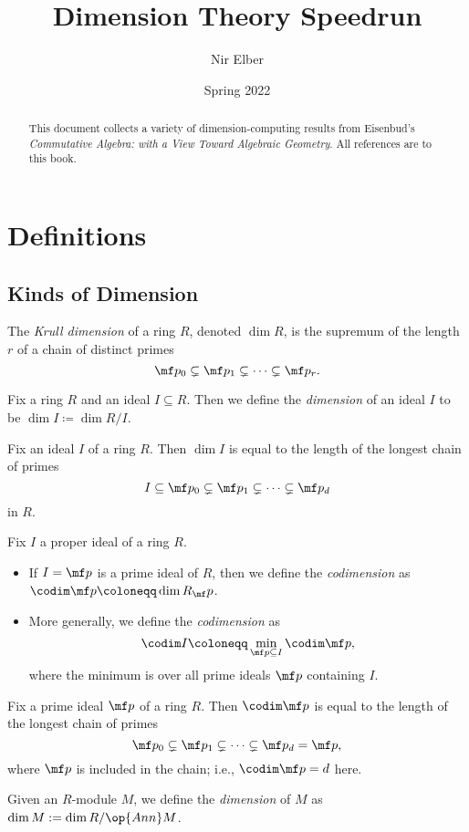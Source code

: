 \documentclass{article}
\title{Dimension Theory Speedrun}
\author{Nir Elber}
\date{Spring 2022}
\begin{document}
\maketitle

\begin{abstract}
	\noindent This document collects a variety of dimension-computing results from Eisenbud's \textit{Commutative Algebra: with a View Toward Algebraic Geometry}. All references are to this book.
\end{abstract}

\setcounter{secnumdepth}{4}
\setcounter{tocdepth}{4}
\tableofcontents

\newpage

\section{Definitions}

\subsection{Kinds of Dimension}
\begin{defi*}[Dimension] \label{def:krulldim}
	The \textit{Krull dimension} of a ring $R$, denoted $\dim R$, is the supremum of the length $r$ of a chain of distinct primes
	\[\mf p_0\subsetneq\mf p_1\subsetneq\cdots\subsetneq\mf p_r.\]
\end{defi*}
\begin{definition*}
	Fix a ring $R$ and an ideal $I\subseteq R$. Then we define the \textit{dimension} of an ideal $I$ to be $\dim I\coloneqq\dim R/I$.
\end{definition*}
\begin{lemma*} \label{lem:dimisascend}
	Fix an ideal $I$ of a ring $R$. Then $\dim I$ is equal to the length of the longest chain of primes
	\[I\subseteq\mf p_0\subsetneq\mf p_1\subsetneq\cdots\subsetneq\mf p_d\]
	in $R$.
\end{lemma*}
\begin{definition*}[Codimension]
	Fix $I$ a proper ideal of a ring $R$.
	\begin{itemize}
		\item If $I=\mf p$ is a prime ideal of $R$, then we define the \textit{codimension} as $\codim\mf p\coloneqq\dim R_\mf p$.
		\item More generally, we define the \textit{codimension} as
		\[\codim I\coloneqq\min_{\mf p\subseteq I}\codim\mf p,\]
		where the minimum is over all prime ideals $\mf p$ containing $I$.
	\end{itemize}
\end{definition*}
\begin{lemma*} \label{lem:codimisdescend}
	Fix a prime ideal $\mf p$ of a ring $R$. Then $\codim\mf p$ is equal to the length of the longest chain of primes
	\[\mf p_0\subsetneq\mf p_1\subsetneq\cdots\subsetneq\mf p_d=\mf p,\]
	where $\mf p$ is included in the chain; i.e., $\codim\mf p=d$ here.
\end{lemma*}
\begin{definition*}
	Given an $R$-module $M$, we define the \textit{dimension} of $M$ as $\dim M:=\dim R/\op{Ann}M$.
\end{definition*}
\end{document}
